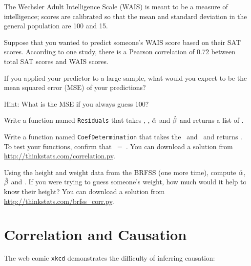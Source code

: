 \documentclass[12pt]{book}
\begin{document}
\begin{exercise}
The Wechsler Adult Intelligence Scale (WAIS) is meant to be a measure
of intelligence; scores are calibrated so that the mean and standard
deviation in the general population are 100 and 15.

Suppose that you wanted to predict someone's WAIS score based on their
SAT scores.  According to one study, there is a Pearson correlation of
0.72 between total SAT scores and WAIS scores.

If you applied your predictor to a large sample, what would you expect to
be the mean squared error (MSE) of your predictions?

Hint: What is the MSE if you always guess 100?
\end{exercise}


\begin{exercise}
Write a function named {\tt Residuals} that takes \X, \Y, $\hat{\alpha}$
and $\hat{\beta}$ and returns a list of \myeps{}.

Write a function named {\tt CoefDetermination} that takes the 
\myeps{}~and \Y~and returns \R{}.  To test your functions, 
confirm that {\R{}~=~\myrho{}}.  You can download a solution
from \url{http://thinkstats.com/correlation.py}.

\end{exercise}

\begin{exercise}
Using the height and weight data from the BRFSS (one more time),
compute $\hat{\alpha}$, $\hat{\beta}$ and \R{}.  If you were trying to guess
someone's weight, how much would it help to know their height?
You can download a solution from
\url{http://thinkstats.com/brfss_corr.py}.

\end{exercise}


\section{Correlation and Causation}

The web comic {\tt xkcd} demonstrates the difficulty of inferring
causation:
\end{document}
